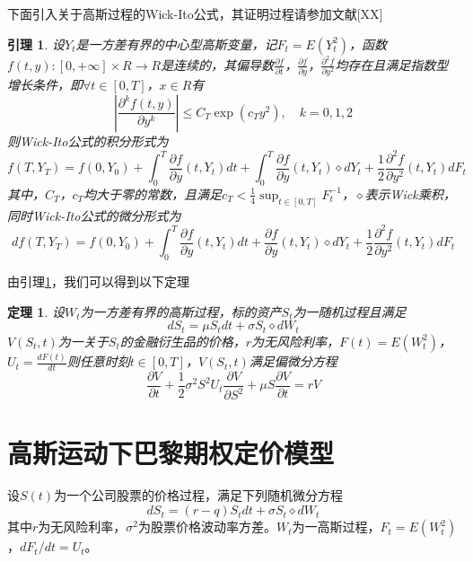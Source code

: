 \documentclass{ctexart} %
\newtheorem{theorem}[definition]{\hspace{2em}定理}
\newtheorem{lemma}[definition]{\hspace{2em}引理}
\begin{document}
下面引入关于高斯过程的Wick-Ito公式，其证明过程请参加文献[XX]
\begin{lemma}
\label{x1}
设$Y_t$是一方差有界的中心型高斯变量，记$F_t=E(Y^2_t)$，函数$f(t,y):[0,+\infty]\times R\rightarrow R$是连续的，其偏导数$\frac{\partial f}{\partial t}$，$\frac{\partial f}{\partial y}$，$\frac{\partial^2 f}{\partial y^2}$均存在且满足指数型增长条件，即$\forall t\in[0,T]$，$x \in R$有
\begin{equation}
|\frac{\partial^k f(t,y)}{\partial y^k}|\leq C_T\exp(c_Ty^2),\quad k=0,1,2
\end{equation}
则Wick-Ito公式的积分形式为
\begin{equation}
f(T,Y_T)=f(0,Y_0)+\int^T_0\frac{\partial f}{\partial y}(t,Y_t)dt+\int^T_0\frac{\partial f}{\partial y}(t,Y_t)\diamond dY_t+\frac{1}{2}\frac{\partial^2 f}{\partial y^2}(t,Y_t)dF_t
\end{equation}
其中，$C_T$，$c_T$均大于零的常数，且满足$c_T<\frac{1}{4}\sup_{t\in[0,T]}F_t^{-1}$，$\diamond$表示Wick乘积，同时Wick-Ito公式的微分形式为
\begin{equation}
df(T,Y_T)=f(0,Y_0)+\int^T_0\frac{\partial f}{\partial y}(t,Y_t)dt+\frac{\partial f}{\partial y}(t,Y_t)\diamond dY_t+\frac{1}{2}\frac{\partial^2 f}{\partial y^2}(t,Y_t)dF_t
\end{equation}
\end{lemma}

由引理\ref{x1}，我们可以得到以下定理
\begin{theorem}
设$W_t$为一方差有界的高斯过程，标的资产$S_t$为一随机过程且满足
\begin{equation}
dS_t=\mu S_tdt+\sigma S_t\diamond dW_t
\end{equation}
$V(S_t,t)$为一关于$S_t$的金融衍生品的价格，$r$为无风险利率，$F(t)=E(W^2_t)$，$U_t=\frac{dF(t)}{dt}$则任意时刻$t\in[0,T]$，$V(S_t,t)$满足偏微分方程
\begin{equation}
\label{f1}
\frac{\partial V}{\partial t}+\frac{1}{2}\sigma^2S^2U_t\frac{\partial V}{\partial S^2}+\mu S\frac{\partial V}{\partial t}=rV
\end{equation}


\end{theorem}


\section{高斯运动下巴黎期权定价模型}
设$S(t)$为一个公司股票的价格过程，满足下列随机微分方程
\begin{equation}
dS_t=(r-q)S_t dt+\sigma S_t \diamond dW_t
\end{equation}
其中$r$为无风险利率，$\sigma^2$为股票价格波动率方差。$W_t$为一高斯过程，$F_t=E(W^2_t)$，$dF_t/dt=U_t$。
\end{document}
